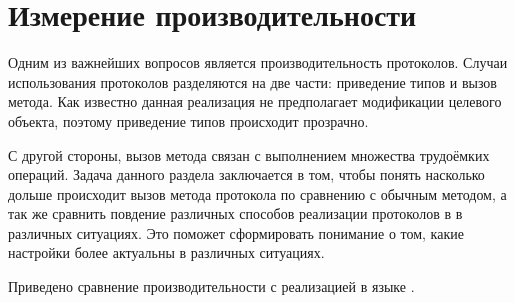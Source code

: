 \section{Измерение производительности} \label{measurements}
Одним из важнейших вопросов является производительность протоколов. Случаи использования протоколов разделяются на две части: приведение типов и вызов метода. Как известно данная реализация не предполагает модификации целевого объекта, поэтому приведение типов происходит прозрачно.

С другой стороны, вызов метода связан с выполнением множества трудоёмких операций. Задача данного раздела заключается в том, чтобы понять насколько дольше происходит вызов метода протокола по сравнению с обычным методом, а так же сравнить повдение различных способов реализации протоколов в  в различных ситуациях. Это поможет сформировать понимание о том, какие настройки более актуальны в различных ситуациях.

Приведено сравнение производительности с реализацией в языке .



